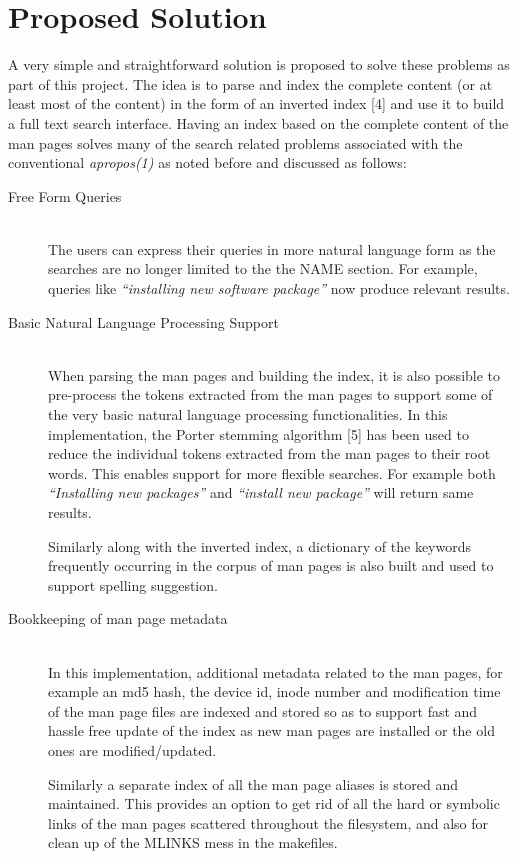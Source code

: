 \documentclass[titlepage, a4paper, 12pt]{article}
\begin{document}
\section{Proposed Solution}
A very simple and straightforward solution is proposed to solve these problems as
part of this project.
The idea is to parse and index
the complete content (or at least most of the content) in the form of an
inverted index [4] and use it to build a full text search
interface. Having an index based on the complete content of the man pages solves
many of the search
related problems associated with the conventional \textit{apropos(1)} as noted
before and discussed as follows:
\begin{description}
\item[Free Form Queries] \hfill \\
The users can express their queries in more natural language form as the searches
are no longer limited to the the NAME section.
For example, queries like \textit{``installing new software package''}
now produce relevant results.
\end{description}
\begin{description}
\item[Basic Natural Language Processing Support] \hfill \\
When parsing the man pages and building the index, it is also possible to
pre-process the tokens extracted from the man pages to support some of the very
basic natural language processing functionalities. In this implementation, the
Porter stemming algorithm [5] has been used to
reduce the individual tokens extracted from the man pages to their root words.
This enables support for more flexible searches. For example both
\textit{``Installing new packages''} and \textit{``install new package''} will
return same results.

Similarly along with the inverted index, a dictionary of the keywords frequently
occurring in the corpus of man pages is also built and used to support
spelling suggestion.
\end{description}
\begin{description}
\item[Bookkeeping of man page metadata] \hfill \\
In this implementation, additional metadata related to the man pages, for example
an md5 hash, the device id, inode number and modification time
of the man page files are indexed and stored so
as to support fast and hassle free update of the index as new man pages are
installed or the old ones are modified/updated.

Similarly a separate index of all the man page aliases is stored and maintained.
This provides an option to get rid of all the hard or symbolic links of the man
pages scattered throughout the filesystem, and also for clean up of the MLINKS
mess in the makefiles.
\end{description}
\end{document}
